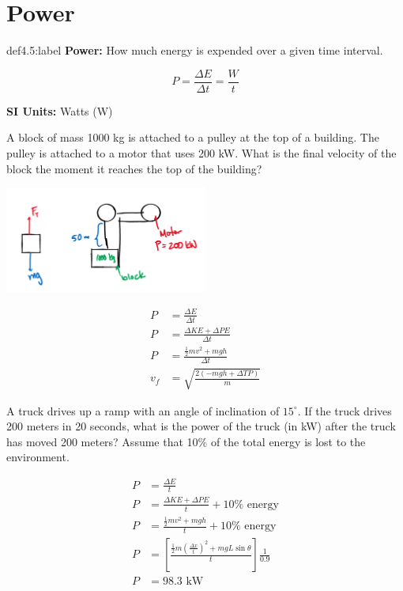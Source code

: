 \section{Power}

\begin{definition}[Power]{def4.5:label}
    \textbf{Power:} How much energy is expended over a given time interval.

    $$
    P = \frac{\Delta E}{\Delta t} = \frac{W}{t}
    $$

    \textbf{SI Units:} Watts (W)
\end{definition}


\begin{problem}
    A block of mass 1000 kg is attached to a pulley at the top of a building. The pulley is attached to a motor that uses 200 kW. What is the final velocity of the block the moment it reaches the top of the building?

    \begin{center}
        \includegraphics[width=0.5\textwidth]{chapters/ch4/images/fig4_8}
    \end{center}

    $$
    \begin{aligned}
        P &= \frac{\Delta E}{\Delta t}\\
        P &= \frac{\Delta KE + \Delta PE}{\Delta t}\\
        P &= \frac{\frac{1}{2}mv^2+mgh}{\Delta t}\\
        v_f &= \sqrt{\frac{2(-mgh+\Delta T P)}{m}}
    \end{aligned}
    $$
\end{problem}


\begin{problem}
    A truck drives up a ramp with an angle of inclination of $15^\circ$. If the truck drives 200 meters in 20 seconds, what is the power of the truck (in kW) after the truck has moved 200 meters? Assume that 10\% of the total energy is lost to the environment.

    $$
    \begin{aligned}
        P &= \frac{\Delta E}{t}\\
        P &= \frac{\Delta KE + \Delta PE}{t}+ 10\%\text{ energy}\\
        P &= \frac{\frac{1}{2}mv^2 + mgh}{t} + 10\%\text{ energy}\\
        P &= \left[\frac{\frac{1}{2}m\left(\frac{\Delta x}{t}\right)^2 + mgL\sin\theta}{t}\right]\frac{1}{0.9}\\
        P &= 98.3 \text{ kW}
    \end{aligned}
    $$
\end{problem}


